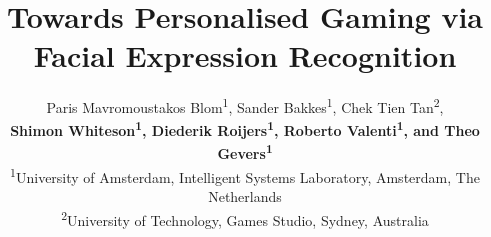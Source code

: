 \documentclass[letterpaper]{article}
\begin{document}
%
\title{Towards Personalised Gaming via Facial Expression Recognition}
\author{\large{Paris Mavromoustakos Blom\textsuperscript{1}, Sander Bakkes\textsuperscript{1}, Chek Tien Tan\textsuperscript{2},}\\\large{\textbf{Shimon Whiteson\textsuperscript{1}, Diederik Roijers\textsuperscript{1}, Roberto Valenti\textsuperscript{1}, and Theo Gevers\textsuperscript{1}}}\\
\small{\textsuperscript{1}University of Amsterdam, Intelligent Systems Laboratory, Amsterdam, The Netherlands}\\
\small{\textsuperscript{2}University of Technology, Games Studio, Sydney, Australia}\\
}
\maketitle
\end{document}
